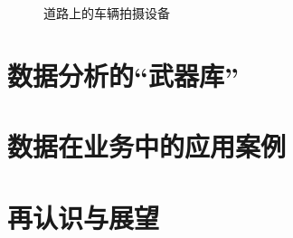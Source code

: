 \documentclass{beamerthemeMono}
\begin{document}
\begin{frame}[t]{\subsecname}
\begin{onlyenv}
\begin{figure}
\begin{columns}[b]
\begin{column}{.5\textwidth}
\begin{figure}
    \end{figure}
  \end{column}
\end{columns}
\caption{道路上的车辆拍摄设备} 
\end{figure}
\end{onlyenv}

\end{frame}


\section{数据分析的``武器库''}


\section{数据在业务中的应用案例}


\section{再认识与展望}



\begin{frame}%
\end{frame}
\end{document}
